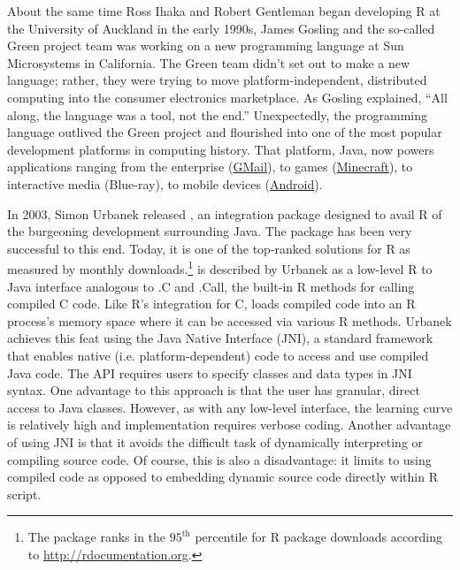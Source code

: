 
About the same time Ross Ihaka and Robert Gentleman began developing R at the University of Auckland in the early 1990s, James Gosling and the so-called Green project team was working on a new programming language at Sun Microsystems in California. The Green team didn't set out to make a new language; rather, they were trying to move platform-independent, distributed computing into the consumer electronics marketplace. As Gosling explained, ``All along, the language was a tool, not the end.'' Unexpectedly, the programming language outlived the Green project and flourished into one of the most popular development platforms in computing history. That platform, Java, now powers applications ranging from the enterprise (\href{https://www.google.com/gmail/about/}{GMail}), to games (\href{https://minecraft.net}{Minecraft}), to interactive media (Blue-ray), to mobile devices (\href{https://www.android.com/}{Android}).

In 2003, Simon Urbanek released , an integration package designed to avail R of the burgeoning development surrounding Java. The package has been very successful to this end. Today, it is one of the top-ranked solutions for R as measured by monthly downloads.\footnote{The  package ranks in the $95^{\text{th}}$ percentile for R package downloads according to \href{http://rdocumentation.org}{http://rdocumentation.org}.}  is described by Urbanek as a low-level R to Java interface analogous to .C and .Call, the built-in R methods for calling compiled C code. Like R's integration for C,  loads compiled code into an R process's memory space where it can be accessed via various R methods. Urbanek achieves this feat using the Java Native Interface (JNI), a standard framework that enables native (i.e. platform-dependent) code to access and use compiled Java code. The  API requires users to specify classes and data types in JNI syntax. One advantage to this approach is that the user has granular, direct access to Java classes. However, as with any low-level interface, the learning curve is relatively high and implementation requires verbose coding. Another advantage of using JNI is that it avoids the difficult task of dynamically interpreting or compiling source code. Of course, this is also a disadvantage: it limits  to using compiled code as opposed to embedding dynamic source code directly within R script.

